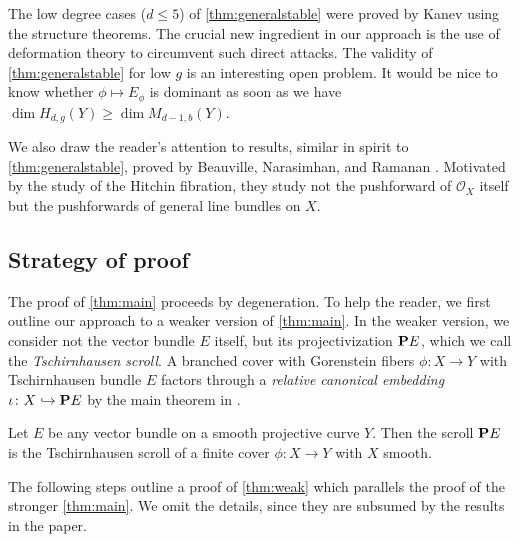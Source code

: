 \documentclass[11 pt]{amsart}
\renewcommand{\O}{{\mathcal O}}
\renewcommand {\P}{{\bf P}}
\providecommand {\from}{{\colon}}
\numberwithin{equation}{section}
\begin{document}
The low degree cases ($d \leq 5$) of \autoref{thm:generalstable} were proved by Kanev \cite{kan:05,kan:04,kan:13} using the structure theorems.
The crucial new ingredient in our approach is the use of deformation theory to circumvent such direct attacks.
The validity of \autoref{thm:generalstable} for low $g$ is an interesting open problem.
It would be nice to know whether $\phi \mapsto E_\phi$ is dominant as soon as we have $\dim H_{d,g}(Y) \geq \dim M_{d-1,b}(Y)$.


We also draw the reader's attention to results, similar in spirit to \autoref{thm:generalstable}, proved by Beauville, Narasimhan, and Ramanan \cite{bea.nar.ram:89}.
Motivated by the study of the Hitchin fibration, they study not the pushforward of $\O_X$ itself but the pushforwards of general line bundles on $X$.




\subsection{Strategy of proof}
The proof of \autoref{thm:main} proceeds by degeneration.
To help the reader, we first outline our approach to a weaker version of \autoref{thm:main}.
In the weaker version, we consider not the vector bundle $E$ itself, but its projectivization $\P E$, which we call the \emph{Tschirnhausen scroll}.
A branched cover with Gorenstein fibers $\phi \from X \to Y$ with Tschirnhausen bundle $E$ factors through a {\sl relative canonical embedding} $\iota \from X \hookrightarrow \P E$ by the main theorem in \cite{cas:96}.
\begin{theorem}\label{thm:weak}
  Let $E$ be any vector bundle on a smooth projective curve $Y$.
  Then the scroll $\P E$ is the Tschirnhausen scroll of a finite cover $\phi \from X \to Y$ with $X$ smooth.
\end{theorem}

The following steps outline a proof of \autoref{thm:weak} which parallels the proof of the stronger \autoref{thm:main}.
We omit the details, since they are subsumed by the results in the paper.
\end{document}
